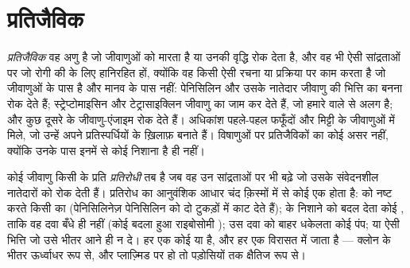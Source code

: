 \section{प्रतिजैविक}

\begin{definition}[प्रतिजैविक]\label{def:g11:antibiotic-resistance:antibiotic}
\emph{प्रतिजैविक} वह अणु है जो जीवाणुओं को मारता है या
उनकी वृद्धि रोक देता है, और वह भी ऐसी सांद्रताओं पर जो रोगी की 
के लिए हानिरहित हों, क्योंकि वह किसी ऐसी रचना या प्रक्रिया पर काम करता है
जो जीवाणुओं के पास है और मानव  के पास नहीं: पेनिसिलिन और उसके
नातेदार जीवाणु की भित्ति का बनना रोक देते हैं; स्ट्रेप्टोमाइसिन और
टेट्रासाइक्लिन जीवाणु का  जाम कर देते हैं, जो हमारे वाले से अलग
है; और कुछ दूसरे  के जीवाणु-एंजाइम रोक देते हैं। अधिकांश
पहले-पहल फफूँदों और मिट्टी के जीवाणुओं में मिले, जो उन्हें अपने
प्रतिस्पर्धियों के ख़िलाफ़ बनाते हैं। विषाणुओं पर प्रतिजैविकों का कोई असर
नहीं, क्योंकि उनके पास इनमें से कोई निशाना है ही नहीं।
\end{definition}

\begin{proposition}[प्रतिरोध की क्रियाविधियाँ]\label{prop:g11:antibiotic-resistance:mechanisms}
कोई जीवाणु किसी  के प्रति
\emph{प्रतिरोधी} तब है जब वह उन सांद्रताओं पर
भी बढ़े जो उसके संवेदनशील नातेदारों को रोक देती हैं। प्रतिरोध का आनुवंशिक
आधार चंद क़िस्मों में से कोई एक होता है:  को नष्ट करते किसी
 का  (पेनिसिलिनेज़ पेनिसिलिन को दो टुकड़ों में काट देते हैं);
 के निशाने को बदल देता कोई , ताकि वह दवा बँधे ही नहीं
(कोई बदला हुआ राइबोसोमी ); उस दवा को बाहर धकेलता कोई पंप; या ऐसी
भित्ति जो उसे भीतर आने ही न दे। हर एक कोई  या  है, और हर एक
विरासत में जाता है --- क्लोन के भीतर ऊर्ध्वाधर रूप से, और प्लाज़्मिड पर हो
तो पड़ोसियों तक क्षैतिज रूप से।
\end{proposition}
\admitted

